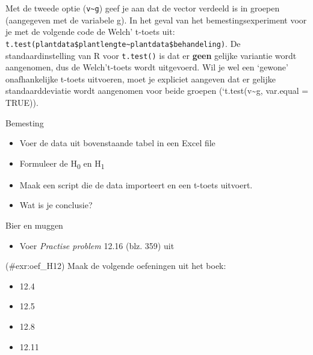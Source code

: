 \documentclass[]{book}
\providecommand{\tightlist}{%
  \setlength{\itemsep}{0pt}\setlength{\parskip}{0pt}}
\theoremstyle{definition}
\theoremstyle{definition}
\theoremstyle{definition}
\theoremstyle{remark}
\let\BeginKnitrBlock\begin \let\EndKnitrBlock\end
\begin{document}
Met de tweede optie (\texttt{v\textasciitilde{}g}) geef je aan dat de
vector verdeeld is in groepen (aangegeven met de variabele g). In het
geval van het bemestingsexperiment voor je met de volgende code de
Welch' t-toets uit:
\texttt{t.test(plantdata\$plantlengte\textasciitilde{}plantdata\$behandeling)}.
De standaardinstelling van R voor \texttt{t.test()} is dat er
\textbf{geen} gelijke variantie wordt aangenomen, dus de Welch't-toets
wordt uitgevoerd. Wil je wel een `gewone' onafhankelijke t-toets
uitvoeren, moet je expliciet aangeven dat er gelijke standaarddeviatie
wordt aangenomen voor beide groepen (`t.test(v\textasciitilde{}g,
var.equal = TRUE)).

\BeginKnitrBlock{exercise}
\protect\hypertarget{exr:bemesting}{}{\label{exr:bemesting} }Bemesting

\begin{itemize}
\tightlist
\item
  Voer de data uit bovenstaande tabel in een Excel file
\item
  Formuleer de H\textsubscript{0} en H\textsubscript{1}
\item
  Maak een script die de data importeert en een t-toets uitvoert.
\item
  Wat is je conclusie?
\end{itemize}
\EndKnitrBlock{exercise}

\BeginKnitrBlock{exercise}
\protect\hypertarget{exr:muggen}{}{\label{exr:muggen} }Bier en muggen

\begin{itemize}
\tightlist
\item
  Voer \emph{Practise problem} 12.16 (blz. 359) uit
\end{itemize}
\EndKnitrBlock{exercise}

\BeginKnitrBlock{exercise}
\protect\hypertarget{exr:oef_H12}{}{(\#exr:oef\_H12) }Maak de volgende
oefeningen uit het boek:

\begin{itemize}
\tightlist
\item
  12.4
\item
  12.5
\item
  12.8
\item
  12.11
\end{itemize}
\EndKnitrBlock{exercise}
\end{document}
